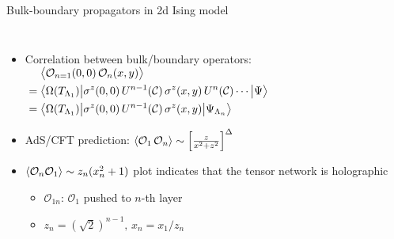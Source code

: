 \documentclass{fdubeamer}
\newcommand{\1}{\mathbb{1}}
\begin{document}
\begin{frame}{Bulk-boundary propagators in 2d Ising model}

\begin{columns}[T]


    \begin{itemize}
      \item Correlation between bulk/boundary operators: \\[-2ex]
        \begingroup
          \small
          \mbox{\quad}
          $
            \begin{aligned}
              &\mathrel{\phantom{=}}
                 \ev[\big]{\mathcal{O}_{n=1}(0,0) \, \mathcal{O}_n(x,y)} \\
              &= \bigl\langle \Omega(T_{\Lambda_1}) \big|
                 \sigma^z(0,0) \, U^{n-1}(\mathcal{C}) \, \sigma^z(x,y) \, U^n(\mathcal{C}) \cdots
                 \big| \Psi \bigr\rangle \\
              &= \bigl\langle \Omega(T_{\Lambda_1}) \big|
                 \sigma^z(0,0) \, U^{n-1}(\mathcal{C}) \, \sigma^z(x,y)
                 \big| \Psi_{\Lambda_n} \bigr\rangle
            \end{aligned}
          $
        \endgroup
      \item AdS/CFT prediction: $\ev{\mathcal{O}_1 \, \mathcal{O}_n} \sim \left[ \frac{z}{x^2+z^2} \right]^\Delta$
      \item $\ev{\mathcal{O}_n\mathcal{O}_1} \sim z_n(x_n^2+1)$ plot indicates that the tensor network is holographic

        \begin{itemize}
          \item $\mathcal{O}_{1n}$: $\mathcal{O}_1$ pushed to $n$-th layer
          \item $z_n=(\sqrt{2})^{n-1}, \, x_n=x_1/z_n$
        \end{itemize}
    \end{itemize}



\end{columns}
\end{frame}
\end{document}
